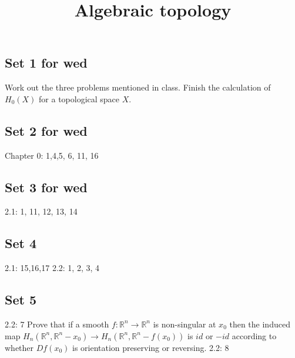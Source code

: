 \documentclass{amsart}
\numberwithin{equation}{section}
\theoremstyle{definition}
\theoremstyle{remark}
\begin{document}
\title{Algebraic topology}
\maketitle
\subsection{Set 1 for wed} 
Work out the three problems mentioned in class. Finish the
calculation of $H _{0} (X) $ for a topological space $X$. 
\subsection{Set 2 for wed}
Chapter 0: 1,4,5, 6, 11, 16 
\subsection{Set 3 for wed}
2.1: 1, 11, 12, 13, 14 
\subsection{Set 4}
2.1: 15,16,17
2.2: 1, 2, 3, 4
\subsection{Set 5}
2.2: 7
Prove that if a smooth $f: \mathbb{R} ^{n} \to \mathbb{R} ^{n} $ is non-singular at $x _{0}$ then the induced map $H _{n}(\mathbb{R}
^{n}, \mathbb{R} ^{n} -x _{0}) \to H _{n}(\mathbb{R}
^{n}, \mathbb{R} ^{n} -f(x _{0}))$ is $id$ or $-id$ according
to whether $Df (x _{0})$ is orientation preserving or
reversing.
2.2: 8
% 
% 
\end{document}
